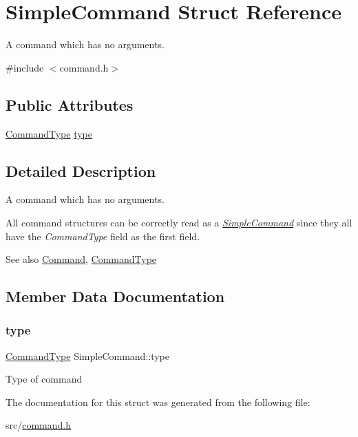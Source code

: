 \hypertarget{structSimpleCommand}{}\section{Simple\+Command Struct Reference}
\label{structSimpleCommand}


A command which has no arguments.  




{\ttfamily \#include $<$command.\+h$>$}

\subsection*{Public Attributes}
\begin{DoxyCompactItemize}
\item 
\hyperlink{command_8h_a21e038f5b8958e203d28bc4f18472352}{Command\+Type} \hyperlink{structSimpleCommand_a9048c04ff50ab9364d56e04e5c3e8ee0}{type}
\end{DoxyCompactItemize}


\subsection{Detailed Description}
A command which has no arguments. 

All command structures can be correctly read as a {\itshape \hyperlink{structSimpleCommand}{Simple\+Command}} since they all have the {\itshape Command\+Type} field as the first field.

\begin{DoxySeeAlso}{See also}
\hyperlink{unionCommand}{Command}, \hyperlink{command_8h_aa8311e0de296df9816965be35c31d925}{Command\+Type} 
\end{DoxySeeAlso}


\subsection{Member Data Documentation}
\mbox{\label{structSimpleCommand_a9048c04ff50ab9364d56e04e5c3e8ee0}} 
\subsubsection{\texorpdfstring{type}{type}}
{\footnotesize\ttfamily \hyperlink{command_8h_a21e038f5b8958e203d28bc4f18472352}{Command\+Type} Simple\+Command\+::type}

Type of command 

The documentation for this struct was generated from the following file\+:\begin{DoxyCompactItemize}
\item 
src/\hyperlink{command_8h}{command.\+h}\end{DoxyCompactItemize}
